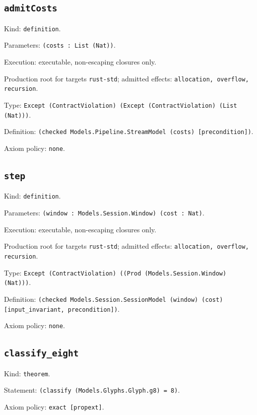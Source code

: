 \documentclass[11pt]{article}
\begin{document}
\subsection*{\texttt{admitCosts}}
\noindent Kind: \texttt{definition}.\par
\noindent Parameters: \texttt{(costs : List (Nat))}.\par
\noindent Execution: executable, non-escaping closures only.\par
\noindent Production root for targets \texttt{rust-std}; admitted effects: \texttt{allocation, overflow, recursion}.\par
\noindent Type: \texttt{Except (ContractViolation) (Except (ContractViolation) (List (Nat)))}.\par
\noindent Definition: \texttt{(checked Models.Pipeline.StreamModel (costs) [precondition])}.\par
\noindent Axiom policy: \texttt{none}.\par
\subsection*{\texttt{step}}
\noindent Kind: \texttt{definition}.\par
\noindent Parameters: \texttt{(window : Models.Session.Window) (cost : Nat)}.\par
\noindent Execution: executable, non-escaping closures only.\par
\noindent Production root for targets \texttt{rust-std}; admitted effects: \texttt{allocation, overflow, recursion}.\par
\noindent Type: \texttt{Except (ContractViolation) ((Prod (Models.Session.Window) (Nat)))}.\par
\noindent Definition: \texttt{(checked Models.Session.SessionModel (window) (cost) [input\_invariant, precondition])}.\par
\noindent Axiom policy: \texttt{none}.\par
\subsection*{\texttt{classify\_eight}}
\noindent Kind: \texttt{theorem}.\par
\noindent Statement: \texttt{(classify (Models.Glyphs.Glyph.g8) = 8)}.\par
\noindent Axiom policy: \texttt{exact [propext]}.\par
\end{document}
